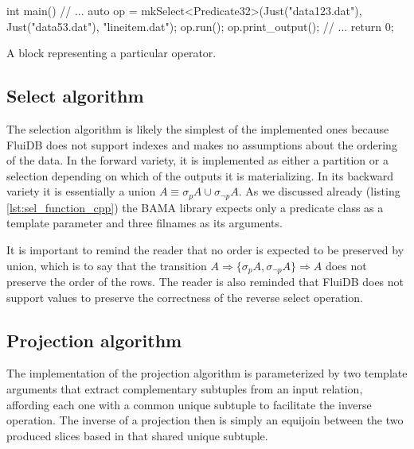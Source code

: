 \begin{code}
\begin{cppcode}
int main() {
  // ...
  {
    auto op = mkSelect<Predicate32>(Just("data123.dat"), Just("data53.dat"),
                                    "lineitem.dat");
    op.run();
    op.print_output();
  }
  // ...
  return 0;
}
\end{cppcode}
  \caption{\label{lst:gen_out_code}A block representing a particular
    operator.}
\end{code}


\subsection{Select algorithm}

The selection algorithm is likely the simplest of the implemented ones
because FluiDB does not support indexes and makes no assumptions about
the ordering of the data. In the forward variety, it is implemented as
either a partition or a selection depending on which of the outputs it
is materializing. In its backward variety it is essentially a union
\(A \equiv \sigma_p A \cup \sigma_{\neg p} A\). As we discussed
already (listing \ref{lst:sel_function_cpp}) the BAMA library expects
only a predicate class as a template parameter and three filnames as
its arguments.

It is important to remind the reader that no order is expected to be
preserved by union, which is to say that the transition \(A
\Rightarrow \{\sigma_p A, \sigma_{\neg p} A\} \Rightarrow A\) does not
preserve the order of the rows. The reader is also reminded that
FluiDB does not support  values to preserve the correctness of
the reverse select operation.


\subsection{Projection algorithm}
\label{sec:projection_algorithm}

The implementation of the projection algorithm is parameterized by two
template arguments that extract complementary subtuples from an input
relation, affording each one with a common unique subtuple to
facilitate the inverse operation. The inverse of a projection then is
simply an equijoin between the two produced slices based in that
shared unique subtuple.

